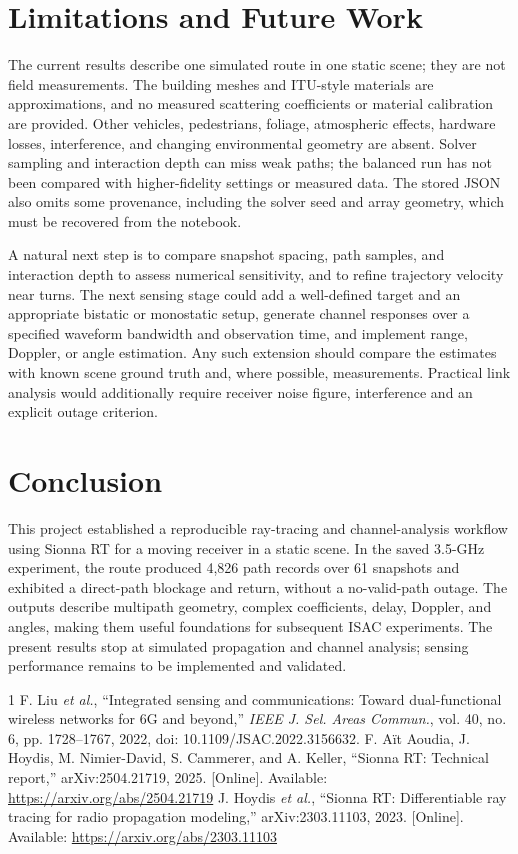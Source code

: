 \documentclass[conference]{IEEEtran}
\begin{document}
\section{Limitations and Future Work}
The current results describe one simulated route in one static scene; they are not field measurements. The building meshes and ITU-style materials are approximations, and no measured scattering coefficients or material calibration are provided. Other vehicles, pedestrians, foliage, atmospheric effects, hardware losses, interference, and changing environmental geometry are absent. Solver sampling and interaction depth can miss weak paths; the balanced run has not been compared with higher-fidelity settings or measured data. The stored JSON also omits some provenance, including the solver seed and array geometry, which must be recovered from the notebook.

A natural next step is to compare snapshot spacing, path samples, and interaction depth to assess numerical sensitivity, and to refine trajectory velocity near turns. The next sensing stage could add a well-defined target and an appropriate bistatic or monostatic setup, generate channel responses over a specified waveform bandwidth and observation time, and implement range, Doppler, or angle estimation. Any such extension should compare the estimates with known scene ground truth and, where possible, measurements. Practical link analysis would additionally require receiver noise figure, interference and an explicit outage criterion.

\section{Conclusion}
This project established a reproducible ray-tracing and channel-analysis workflow using Sionna RT for a moving receiver in a static scene. In the saved 3.5-GHz experiment, the route produced 4,826 path records over 61 snapshots and exhibited a direct-path blockage and return, without a no-valid-path outage. The outputs describe multipath geometry, complex coefficients, delay, Doppler, and angles, making them useful foundations for subsequent ISAC experiments. The present results stop at simulated propagation and channel analysis; sensing performance remains to be implemented and validated.

\begin{thebibliography}{1}
 F. Liu \emph{et al.}, ``Integrated sensing and communications: Toward dual-functional wireless networks for 6G and beyond,'' \emph{IEEE J. Sel. Areas Commun.}, vol. 40, no. 6, pp. 1728--1767, 2022, doi: 10.1109/JSAC.2022.3156632.
 F. A\"it Aoudia, J. Hoydis, M. Nimier-David, S. Cammerer, and A. Keller, ``Sionna RT: Technical report,'' arXiv:2504.21719, 2025. [Online]. Available: \url{https://arxiv.org/abs/2504.21719}
 J. Hoydis \emph{et al.}, ``Sionna RT: Differentiable ray tracing for radio propagation modeling,'' arXiv:2303.11103, 2023. [Online]. Available: \url{https://arxiv.org/abs/2303.11103}
\end{thebibliography}
\end{document}
